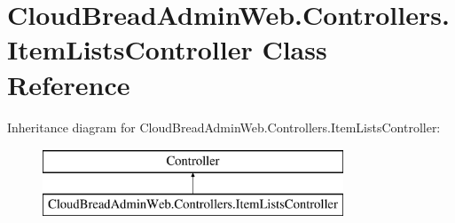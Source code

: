 \hypertarget{class_cloud_bread_admin_web_1_1_controllers_1_1_item_lists_controller}{}\section{Cloud\+Bread\+Admin\+Web.\+Controllers.\+Item\+Lists\+Controller Class Reference}
\label{class_cloud_bread_admin_web_1_1_controllers_1_1_item_lists_controller}
Inheritance diagram for Cloud\+Bread\+Admin\+Web.\+Controllers.\+Item\+Lists\+Controller\+:\begin{figure}[H]
\begin{center}
\leavevmode
\includegraphics[height=2.000000cm]{class_cloud_bread_admin_web_1_1_controllers_1_1_item_lists_controller}
\end{center}
\end{figure}
